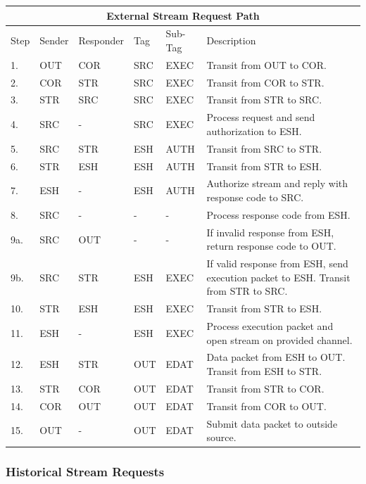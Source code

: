 \documentclass{article}
\begin{document}
\begin{flushleft}
\begin{center}
\begin{tabular}{ | p{1cm} || p{2cm} | p{2cm} | p{2cm} | p{2cm} | p{6cm} | }
\hline
\multicolumn{6}{|c|}{External Stream Request Path}\\
\hline
Step & Sender & Responder & Tag & Sub-Tag & Description\\
1. & OUT & COR & SRC & EXEC & Transit from OUT to COR.\\
2. & COR & STR & SRC & EXEC & Transit from COR to STR.\\
3. & STR & SRC & SRC & EXEC & Transit from STR to SRC.\\
4. & SRC &  -  & SRC & EXEC & Process request and send authorization to ESH.\\
5. & SRC & STR & ESH & AUTH & Transit from SRC to STR.\\
6. & STR & ESH & ESH & AUTH & Transit from STR to ESH.\\
7. & ESH &  -  & ESH & AUTH & Authorize stream and reply with response code to SRC.\\
8. & SRC &  -  &  -  &  -   & Process response code from ESH.\\
9a. & SRC & OUT &  -  &  -   & If invalid response from ESH, return response code to OUT.\\
9b. & SRC & STR & ESH & EXEC & If valid response from ESH, send execution packet to ESH. Transit from STR to SRC.\\
10. & STR & ESH & ESH & EXEC & Transit from STR to ESH.\\
11. & ESH &  -  & ESH & EXEC & Process execution packet and open stream on provided channel.\\
12. & ESH & STR & OUT & EDAT & Data packet from ESH to OUT. Transit from ESH to STR.\\
13. & STR & COR & OUT & EDAT & Transit from STR to COR.\\
14. & COR & OUT & OUT & EDAT & Transit from COR to OUT.\\
15. & OUT &  -  & OUT & EDAT & Submit data packet to outside source.\\ 
\hline
\end{tabular}
\end{center}
\end{flushleft}


\cleardoublepage
\subsubsection{Historical Stream Requests}
\end{document}
